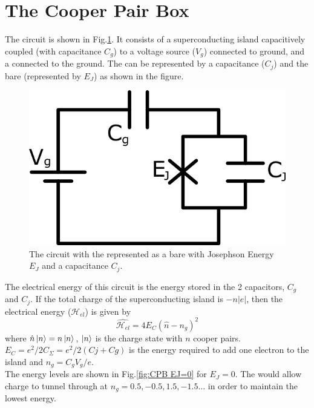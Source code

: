 \section{The Cooper Pair Box}

The \CPB circuit is shown in Fig.\ref{fig:cooperpairbox}. It consists of a superconducting island capacitively coupled (with capacitance $C_g$) to a voltage source ($V_g$) connected to ground, and a \JJ connected to the ground. The \JJ can be represented by a capacitance ($C_j$) and the bare \JJ (represented by $E_J$) as shown in the figure.

\begin{figure}
\centering
\includegraphics{Figures/CPB.png}
\decoRule
\caption[\CPB circuit]{The \CPB circuit with the \JJ represented as a bare \JJ with Josephson Energy $E_J$ and a capacitance $C_j$.}
\label{fig:cooperpairbox}
\end{figure}

The electrical energy of this circuit is the energy stored in the 2 capacitors, $C_g$ and $C_j$. If the total charge of the superconducting island is $-n|e|$, then the electrical energy ($\mathcal{H}_{el}$) is given by \cite{Schuster2007}
\begin{equation}
\hat{\mathcal{H}_{el}}=4E_C(\hat{n}-n_g)^2
\end{equation}
where $\hat{n}\ket{n}=n\ket{n}$, $\ket{n}$ is the charge state with $n$ cooper pairs.\\
$E_C=e^2/2C_\Sigma=e^2/2(Cj+Cg)$ is the energy required to add one electron to the island and $n_g=C_gV_g/e$.\\
The energy levels are shown in Fig.\ref{fig:CPB EJ=0} for $E_J=0$. The \JJ would allow charge to tunnel through at $n_g=0.5,-0.5,1.5,-1.5\ldots$ in order to maintain the lowest energy.

